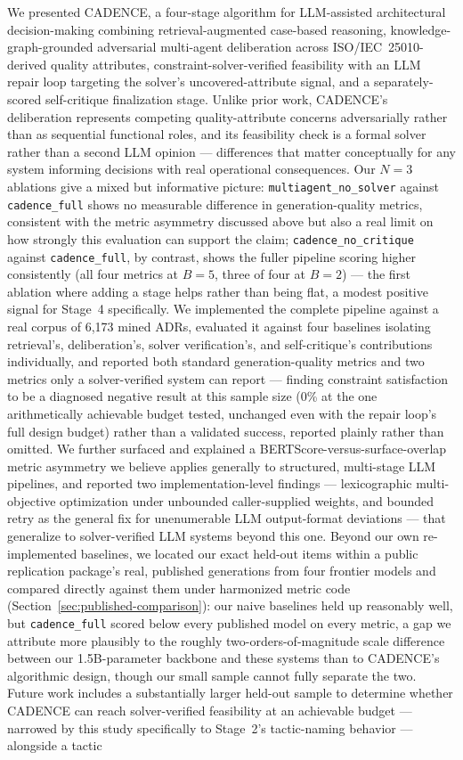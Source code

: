 \documentclass[lettersize,journal]{IEEEtran}
\begin{document}
We presented CADENCE, a four-stage algorithm for LLM-assisted architectural decision-making combining retrieval-augmented case-based reasoning, knowledge-graph-grounded adversarial multi-agent deliberation across ISO/IEC~25010-derived quality attributes, constraint-solver-verified feasibility with an LLM repair loop targeting the solver's uncovered-attribute signal, and a separately-scored self-critique finalization stage. Unlike prior work, CADENCE's deliberation represents competing quality-attribute concerns adversarially rather than as sequential functional roles, and its feasibility check is a formal solver rather than a second LLM opinion --- differences that matter conceptually for any system informing decisions with real operational consequences. Our $N=3$ ablations give a mixed but informative picture: \texttt{multiagent\_no\_solver} against \texttt{cadence\_full} shows no measurable difference in generation-quality metrics, consistent with the metric asymmetry discussed above but also a real limit on how strongly this evaluation can support the claim; \texttt{cadence\_no\_critique} against \texttt{cadence\_full}, by contrast, shows the fuller pipeline scoring higher consistently (all four metrics at $B=5$, three of four at $B=2$) --- the first ablation where adding a stage helps rather than being flat, a modest positive signal for Stage~4 specifically. We implemented the complete pipeline against a real corpus of 6{,}173 mined ADRs, evaluated it against four baselines isolating retrieval's, deliberation's, solver verification's, and self-critique's contributions individually, and reported both standard generation-quality metrics and two metrics only a solver-verified system can report --- finding constraint satisfaction to be a diagnosed negative result at this sample size (0\% at the one arithmetically achievable budget tested, unchanged even with the repair loop's full design budget) rather than a validated success, reported plainly rather than omitted. We further surfaced and explained a BERTScore-versus-surface-overlap metric asymmetry we believe applies generally to structured, multi-stage LLM pipelines, and reported two implementation-level findings --- lexicographic multi-objective optimization under unbounded caller-supplied weights, and bounded retry as the general fix for unenumerable LLM output-format deviations --- that generalize to solver-verified LLM systems beyond this one. Beyond our own re-implemented baselines, we located our exact held-out items within a public replication package's real, published generations from four frontier models and compared directly against them under harmonized metric code (Section~\ref{sec:published-comparison}): our naive baselines held up reasonably well, but \texttt{cadence\_full} scored below every published model on every metric, a gap we attribute more plausibly to the roughly two-orders-of-magnitude scale difference between our 1.5B-parameter backbone and these systems than to CADENCE's algorithmic design, though our small sample cannot fully separate the two. Future work includes a substantially larger held-out sample to determine whether CADENCE can reach solver-verified feasibility at an achievable budget --- narrowed by this study specifically to Stage~2's tactic-naming behavior --- alongside a tactic 
\end{document}

